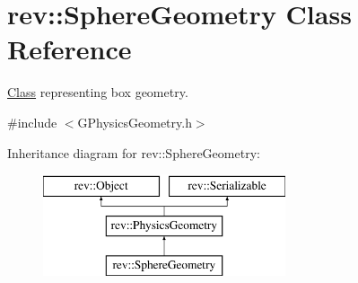 \hypertarget{classrev_1_1_sphere_geometry}{}\section{rev\+::Sphere\+Geometry Class Reference}
\label{classrev_1_1_sphere_geometry}


\mbox{\hyperlink{struct_class}{Class}} representing box geometry.  




{\ttfamily \#include $<$G\+Physics\+Geometry.\+h$>$}

Inheritance diagram for rev\+::Sphere\+Geometry\+:\begin{figure}[H]
\begin{center}
\leavevmode
\includegraphics[height=3.000000cm]{classrev_1_1_sphere_geometry}
\end{center}
\end{figure}
